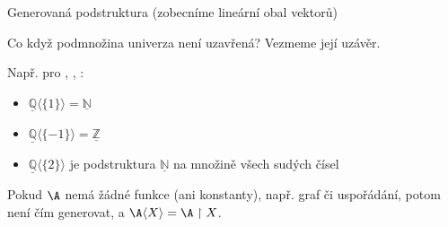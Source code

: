 \documentclass{beamer}
\begin{document}
\begin{frame}{Generovaná podstruktura (zobecníme lineární obal vektorů)}
    
    \pause
    Co když podmnožina univerza \alert{není} uzavřená? Vezmeme její \alert{uzávěr}. %

    \medskip

    \pause

    \medskip

    \pause
    Např. pro , , : \pause
    \begin{itemize}
        \item $\underline{\mathbb Q}\langle\{1\}\rangle=\underline{\mathbb N}$\pause
        \item $\underline{\mathbb Q}\langle\{-1\}\rangle=\underline{\mathbb Z}$\pause
        \item $\underline{\mathbb Q}\langle\{2\}\rangle$ je podstruktura $\underline{\mathbb N}$ na množině všech sudých čísel
    \end{itemize}

    \medskip
    
    \pause
    Pokud $\A$ nemá žádné funkce (ani konstanty), např. graf či uspořádání, potom není čím generovat, a $\A\langle X\rangle=\A\restriction X$.
    
\end{frame}
\end{document}
